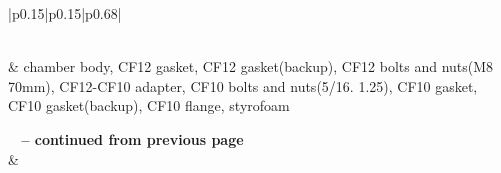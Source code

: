 \begin{longtable}{|p{0.15\linewidth}|p{0.15\linewidth}|p{0.68\linewidth}|} 
\caption{pGRAMS Osaka bench Components list} \label{tab:Osaka_components} \\
\hline
{} & chamber body, CF12 gasket, CF12 gasket(backup), CF12 bolts and nuts(M8 70mm), CF12-CF10 adapter, CF10 bolts and nuts(5/16. 1.25), CF10 gasket, CF10 gasket(backup), CF10 flange, styrofoam \\
\hline
\endfirsthead

%
{{\bfseries \tablename\ \thetable{} -- continued from previous page}} \\
\hline
{} & \\
\hline
\endhead

\hline {} \\ \hline
\endfoot

\hline \hline
\endlastfoot


\end{longtable}
